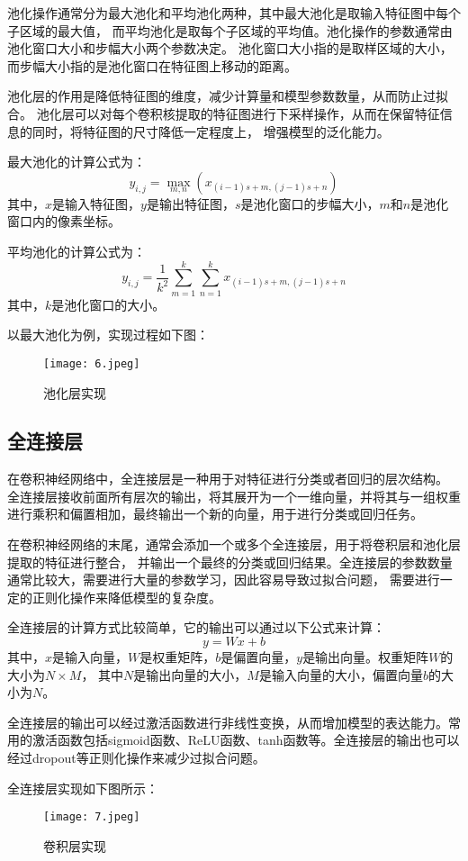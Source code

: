 \documentclass[AutoFakeBold]{LZUThesis}
\begin{document}
池化操作通常分为最大池化和平均池化两种，其中最大池化是取输入特征图中每个子区域的最大值，
而平均池化是取每个子区域的平均值。池化操作的参数通常由池化窗口大小和步幅大小两个参数决定。
池化窗口大小指的是取样区域的大小，而步幅大小指的是池化窗口在特征图上移动的距离。

池化层的作用是降低特征图的维度，减少计算量和模型参数数量，从而防止过拟合。
池化层可以对每个卷积核提取的特征图进行下采样操作，从而在保留特征信息的同时，将特征图的尺寸降低一定程度上，
增强模型的泛化能力。



最大池化的计算公式为：
$$y_{i,j} = \max_{m,n}(x_{(i-1)s+m,(j-1)s+n})$$
其中，$x$是输入特征图，$y$是输出特征图，$s$是池化窗口的步幅大小，$m$和$n$是池化窗口内的像素坐标。

平均池化的计算公式为：
$$y_{i,j} = \frac{1}{k^2}\sum_{m=1}^k\sum_{n=1}^k x_{(i-1)s+m,(j-1)s+n}$$
其中，$k$是池化窗口的大小。

以最大池化为例，实现过程如下图：
\begin{figure}[H]
    \centering
    \texttt{[image: 6.jpeg]}
    \caption{池化层实现}
    \label{figure}
 \end{figure}

\subsection{全连接层}
在卷积神经网络中，全连接层是一种用于对特征进行分类或者回归的层次结构。
全连接层接收前面所有层次的输出，将其展开为一个一维向量，并将其与一组权重进行乘积和偏置相加，最终输出一个新的向量，用于进行分类或回归任务。

在卷积神经网络的末尾，通常会添加一个或多个全连接层，用于将卷积层和池化层提取的特征进行整合，
并输出一个最终的分类或回归结果。全连接层的参数数量通常比较大，需要进行大量的参数学习，因此容易导致过拟合问题，
需要进行一定的正则化操作来降低模型的复杂度。

全连接层的计算方式比较简单，它的输出可以通过以下公式来计算：
$$y = Wx+b$$
其中，$x$是输入向量，$W$是权重矩阵，$b$是偏置向量，$y$是输出向量。权重矩阵$W$的大小为$N\times M$，
其中$N$是输出向量的大小，$M$是输入向量的大小，偏置向量$b$的大小为$N$。

全连接层的输出可以经过激活函数进行非线性变换，从而增加模型的表达能力。常
用的激活函数包括sigmoid函数、ReLU函数、tanh函数等。全连接层的输出也可以经过dropout等正则化操作来减少过拟合问题。

全连接层实现如下图所示：
\begin{figure}[H]
    \centering
    \texttt{[image: 7.jpeg]}
    \caption{卷积层实现}
    \label{figure}
 \end{figure}
\end{document}
